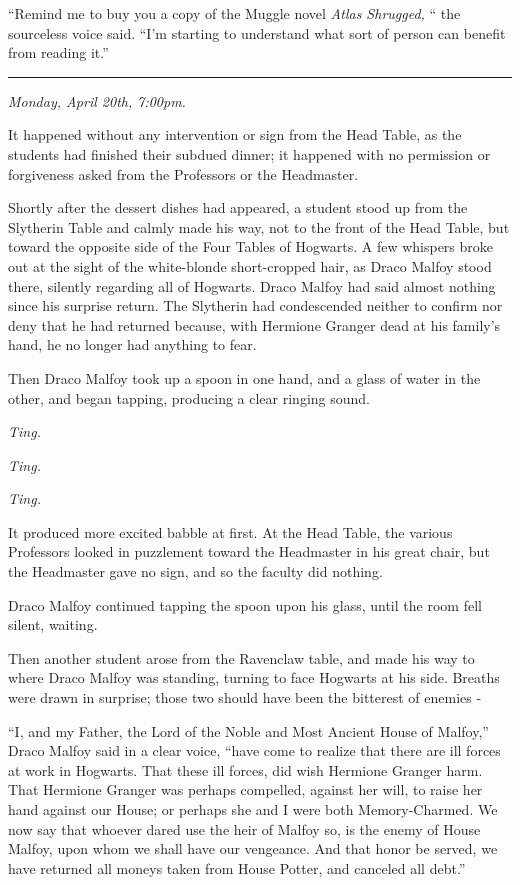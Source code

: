 ``Remind me to buy you a copy of the Muggle novel \emph{Atlas Shrugged,}
`` the sourceless voice said. ``I'm starting to understand what sort of
person can benefit from reading it.''

\begin{center}\rule{3in}{0.4pt}\end{center}

\emph{Monday, April 20th, 7:00pm.}

It happened without any intervention or sign from the Head Table, as the
students had finished their subdued dinner; it happened with no
permission or forgiveness asked from the Professors or the Headmaster.

Shortly after the dessert dishes had appeared, a student stood up from
the Slytherin Table and calmly made his way, not to the front of the
Head Table, but toward the opposite side of the Four Tables of Hogwarts.
A few whispers broke out at the sight of the white-blonde short-cropped
hair, as Draco Malfoy stood there, silently regarding all of Hogwarts.
Draco Malfoy had said almost nothing since his surprise return. The
Slytherin had condescended neither to confirm nor deny that he had
returned because, with Hermione Granger dead at his family's hand, he no
longer had anything to fear.

Then Draco Malfoy took up a spoon in one hand, and a glass of water in
the other, and began tapping, producing a clear ringing sound.

\emph{Ting.}

\emph{Ting.}

\emph{Ting.}

It produced more excited babble at first. At the Head Table, the various
Professors looked in puzzlement toward the Headmaster in his great
chair, but the Headmaster gave no sign, and so the faculty did nothing.

Draco Malfoy continued tapping the spoon upon his glass, until the room
fell silent, waiting.

Then another student arose from the Ravenclaw table, and made his way to
where Draco Malfoy was standing, turning to face Hogwarts at his side.
Breaths were drawn in surprise; those two should have been the bitterest
of enemies -

``I, and my Father, the Lord of the Noble and Most Ancient House of
Malfoy,'' Draco Malfoy said in a clear voice, ``have come to realize
that there are ill forces at work in Hogwarts. That these ill forces,
did wish Hermione Granger harm. That Hermione Granger was perhaps
compelled, against her will, to raise her hand against our House; or
perhaps she and I were both Memory-Charmed. We now say that whoever
dared use the heir of Malfoy so, is the enemy of House Malfoy, upon whom
we shall have our vengeance. And that honor be served, we have returned
all moneys taken from House Potter, and canceled all debt.''

